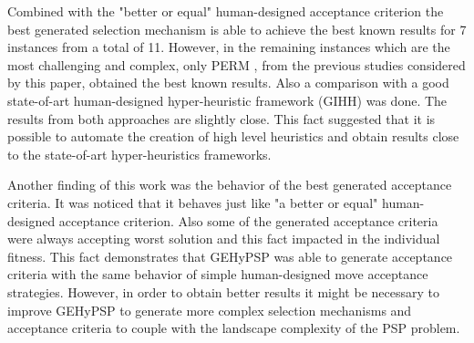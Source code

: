 \documentclass[conference]{IEEEtran}
\begin{document}
Combined with the "better or equal" human-designed acceptance criterion the best generated selection mechanism is able to achieve the best known results for 7 instances from a total of 11. However, in the remaining instances which are the most challenging and complex, only PERM \cite{hsu2003growth}, from the previous studies considered by this paper,  obtained the best known results. Also a comparison with a good state-of-art human-designed hyper-heuristic framework (GIHH) \cite{misir2012intelligent} was done. The results from both approaches are slightly close. This fact suggested that it is possible to automate the creation of high level heuristics and obtain results close to the state-of-art hyper-heuristics frameworks. 

 Another finding of this work was the behavior of the best generated acceptance criteria. It was noticed that it behaves just like "a better or equal" human-designed acceptance criterion. Also some of the generated acceptance criteria were always accepting worst solution and this fact impacted in the individual fitness. This fact demonstrates that GEHyPSP was able to generate acceptance criteria with the same behavior of simple human-designed move acceptance strategies. However, in order to obtain better results it might be necessary to improve GEHyPSP to generate more complex selection mechanisms and acceptance criteria to couple with the landscape complexity of the PSP problem. 
 
 

 
  











%
%
%
	
	



\end{document}

